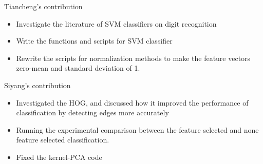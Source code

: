 \documentclass[12pt]{article}
\newenvironment{nscenter}
 {\parskip=0pt\par\nopagebreak\centering}
 {\par\noindent\ignorespacesafterend}
\begin{document}




\newpage
\begin{nscenter}
\Large{Tiancheng's contribution}
\end{nscenter}
\begin{itemize}
\item Investigate the literature of SVM classifiers on digit recognition
\item Write the functions and scripts for SVM classifier
\item Rewrite the scripts for normalization methods to make the feature vectors zero-mean and standard deviation of 1.
\end{itemize}

\newpage
\begin{nscenter}
\Large{Siyang's contribution}
\end{nscenter}
\begin{itemize}
\item Investigated the HOG, and discussed how it improved the performance of classification by detecting edges more accurately
\item Running the experimental comparison between the feature selected and none feature selected classification.
\item Fixed the kernel-PCA code
\end{itemize}



\end{document}
